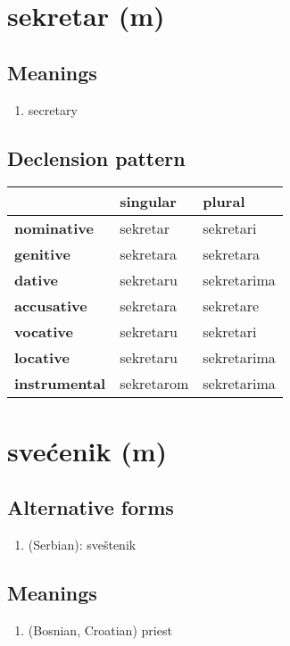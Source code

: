 \filbreak
\section{sekretar (m)}
\subsection*{Meanings}
\begin{enumerate}
\item secretary
\end{enumerate}
\subsection*{Declension pattern}
\begin{tabularx}{\linewidth}{Xll}
\toprule
{} &    singular &       plural \\
\midrule
\textbf{nominative  } &    sekretar &    sekretari \\
\textbf{genitive    } &   sekretara &    sekretara \\
\textbf{dative      } &   sekretaru &  sekretarima \\
\textbf{accusative  } &   sekretara &    sekretare \\
\textbf{vocative    } &   sekretaru &    sekretari \\
\textbf{locative    } &   sekretaru &  sekretarima \\
\textbf{instrumental} &  sekretarom &  sekretarima \\
\bottomrule
\end{tabularx}

\filbreak
\section{svećenik (m)}
\subsection*{Alternative forms}
\begin{enumerate}
\item (Serbian): sveštenik
\end{enumerate}
\subsection*{Meanings}
\begin{enumerate}
\item (Bosnian, Croatian) priest
\end{enumerate}
